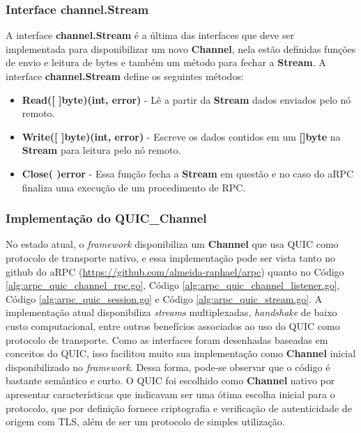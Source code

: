 \subsubsection{Interface channel.Stream}

A interface \textbf{channel.Stream} é a última das interfaces que deve ser implementada para disponibilizar um novo \textbf{Channel}, nela estão definidas funções de envio e leitura de bytes e também um método para fechar a \textbf{Stream}. A interface \textbf{channel.Stream} define os seguintes métodos:

\begin{itemize}
	\item \textbf{Read([ ]byte)(int, error)} - Lê a partir da \textbf{Stream} dados enviados pelo nó remoto.
	\item \textbf{Write([ ]byte)(int, error)} - Escreve os dados contidos em um \textbf{[]byte} na \textbf{Stream} para leitura pelo nó remoto.
	\item \textbf{Close( )error} - Essa função fecha a \textbf{Stream} em questão e no caso do aRPC finaliza uma execução de um procedimento de RPC.
\end{itemize}

\subsubsection{Implementação do \textbf{QUIC\_Channel}}

No estado atual, o \textit{framework} disponibiliza um \textbf{Channel} que usa QUIC como protocolo de transporte nativo, e essa implementação pode ser vista tanto no github do aRPC (\url{https://github.com/almeida-raphael/arpc}) quanto no Código \ref{alg:arpc_quic_channel_rpc.go}, Código \ref{alg:arpc_quic_channel_listener.go}, Código \ref{alg:arpc_quic_session.go} e Código \ref{alg:arpc_quic_stream.go}. A implementação atual disponibiliza \textit{streams} multiplexadas, \textit{handshake} de baixo custo computacional, entre outros benefícios associados ao uso do QUIC como protocolo de transporte. Como as interfaces foram desenhadas baseadas em conceitos do QUIC, isso facilitou muito sua implementação como \textbf{Channel} inicial disponibilizado no \textit{framework}. Dessa forma, pode-se observar que o código é bastante semântico e curto. O QUIC foi escolhido como \textbf{Channel} nativo por apresentar características que indicavam ser uma ótima escolha inicial para o protocolo, que por definição fornece criptografia e verificação de autenticidade de origem com TLS, além de ser um protocolo de simples utilização.

